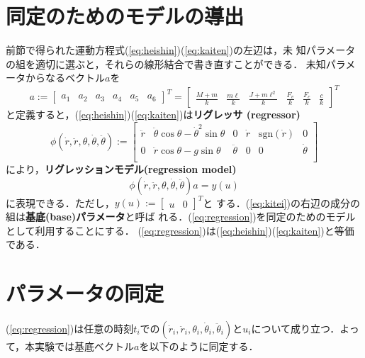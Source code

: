\section{同定のためのモデルの導出}
前節で得られた運動方程式(\ref{eq:heishin})(\ref{eq:kaiten})の左辺は，未
知パラメータの組を適切に選ぶと，それらの線形結合で書き直すことができる．
未知パラメータからなるベクトル$a$を
\begin{equation}
 a :=
  \left[
   \begin{array}{cccccc}
    a_1 & a_2 & a_3 & a_4 & a_5 & a_6
   \end{array}
  \right]^T =
      \left[
       \begin{array}{cccccc}
	\displaystyle\frac{M + m}{k} & \displaystyle\frac{m\ell}{k} & 
	 \displaystyle\frac{J + m\ell^2}{k} & \displaystyle\frac{F_v}{k} & 
	 \displaystyle\frac{F_c}{k} & \displaystyle\frac{c}{k}
       \end{array}
      \right]^T
 \label{eq:kitei}
\end{equation}
と定義すると，(\ref{eq:heishin})(\ref{eq:kaiten})は{\bf リグレッサ
(regressor)}
\begin{equation}
 \phi(\dot{r}, \ddot{r}, \theta, \dot{\theta}, \ddot{\theta}) := 
 \left[
 \begin{array}{cccccc}
  \ddot{r} & \ddot{\theta}\cos\theta - \dot{\theta}^2\sin\theta& 0 &
   \dot{r} & \mbox{sgn}(\dot{r}) & 0 \\
  0 & \ddot{r}\cos\theta - g \sin\theta & \ddot{\theta} &
   0 & 0 & \dot{\theta} \\
 \end{array}
\right]
\end{equation}
により，{\bf リグレッションモデル(regression model)}
\begin{equation}
 \phi(\dot{r}, \ddot{r}, \theta, \dot{\theta}, \ddot{\theta}) a = y(u)
  \label{eq:regression}
\end{equation}
に表現できる．ただし，$y(u) := [\begin{array}{cc} u & 0\end{array}]^T$と
する．(\ref{eq:kitei})の右辺の成分の組は{\bf 基底(base)パラメータ}と呼ば
れる．(\ref{eq:regression})を同定のためのモデルとして利用することにする．
(\ref{eq:regression})は(\ref{eq:heishin})(\ref{eq:kaiten})と等価
である．
\section{パラメータの同定}\label{subsec:ident}
(\ref{eq:regression})は任意の時刻$t_i$での$(\dot{r}_i, \ddot{r}_i,
\theta_i, \dot{\theta}_i, \ddot{\theta}_i)$と$u_i$について成り立つ．よっ
て，本実験では基底ベクトル$a$を以下のように同定する．

